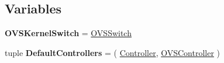 \subsection*{Variables}
\begin{DoxyCompactItemize}
\item 
\hypertarget{namespacemininet_1_1node_ae6fc422d981204f54b9e3dd3b9205d3f}{{\bfseries O\-V\-S\-Kernel\-Switch} = \hyperlink{classmininet_1_1node_1_1OVSSwitch}{O\-V\-S\-Switch}}\label{namespacemininet_1_1node_ae6fc422d981204f54b9e3dd3b9205d3f}

\item 
\hypertarget{namespacemininet_1_1node_acf90c586b9ae0f455bce53653835f4e2}{tuple {\bfseries Default\-Controllers} = ( \hyperlink{classmininet_1_1node_1_1Controller}{Controller}, \hyperlink{classmininet_1_1node_1_1OVSController}{O\-V\-S\-Controller} )}\label{namespacemininet_1_1node_acf90c586b9ae0f455bce53653835f4e2}

\end{DoxyCompactItemize}



